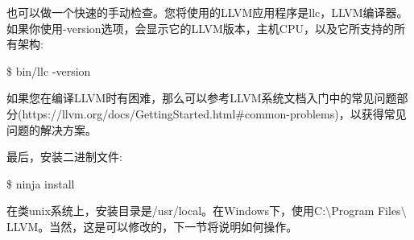 也可以做一个快速的手动检查。您将使用的LLVM应用程序是llc，LLVM编译器。如果你使用-version选项，会显示它的LLVM版本，主机CPU，以及它所支持的所有架构:\par

\begin{tcolorbox}[colback=white,colframe=black]
	\$ bin/llc -version
\end{tcolorbox}

如果您在编译LLVM时有困难，那么可以参考LLVM系统文档入门中的常见问题部分(https://llvm.org/docs/GettingStarted.html\#common-problems)，以获得常见问题的解决方案。\par

最后，安装二进制文件:\par

\begin{tcolorbox}[colback=white,colframe=black]
	\$ ninja install
\end{tcolorbox}

在类unix系统上，安装目录是/usr/local。在Windows下，使用C:$\setminus$Program Files$\setminus$LLVM。当然，这是可以修改的，下一节将说明如何操作。\par






